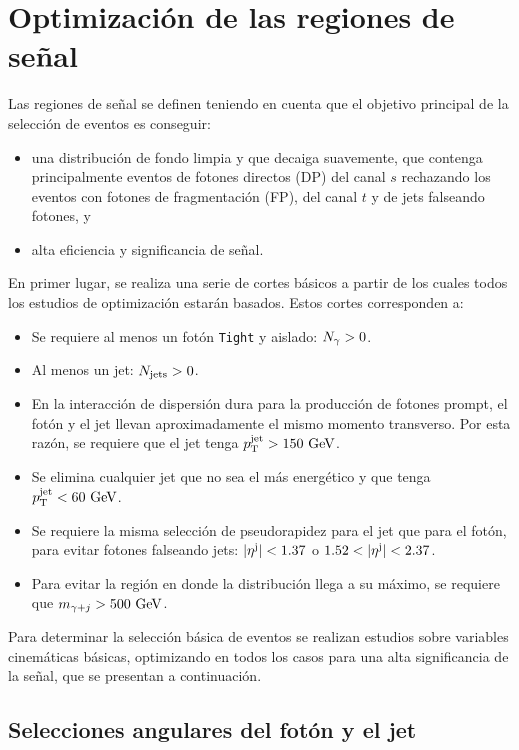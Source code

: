 \section{Optimización de las regiones de señal}
\label{sec:evt_selection:sr_opt}

Las regiones de señal se definen teniendo en cuenta que el objetivo principal de la selección de eventos es conseguir:
\begin{itemize}
    \item una distribución de fondo limpia y que decaiga suavemente, que contenga principalmente eventos \gammajet de fotones directos (\acs{DP}) del canal \(s\) rechazando los eventos con fotones de fragmentación (\acs{FP}), del canal \(t\) y de jets falseando fotones, y
    \item alta eficiencia y significancia de señal.
\end{itemize}


En primer lugar, se realiza una serie de cortes básicos a partir de los cuales todos los estudios de optimización estarán basados. Estos cortes corresponden a:
\begin{itemize}
    \item Se requiere al menos un fotón \texttt{Tight} y aislado: \(N_{\gamma} > 0\).
    \item Al menos un jet: \(N_{\text{jets}} > 0\).
    \item En la interacción de dispersión dura para la producción de fotones prompt, el fotón y el jet llevan aproximadamente el mismo momento transverso. Por esta razón, se requiere que el jet tenga \(p_{\text{T}}^\text{jet} > 150~\text{GeV}\).
    \item Se elimina cualquier jet que no sea el más energético y que tenga \(p_{\text{T}}^\text{jet} < 60~\text{GeV}\).
    \item Se requiere la misma selección de pseudorapidez para el jet que para el fotón, para evitar fotones falseando jets: \(|\eta^{\text{j}}| < 1.37\) o \(1.52 < |\eta^{\text{j}}| < 2.37\).
    \item Para evitar la región en donde la distribución \myj llega a su máximo, se requiere que \(m_{\gamma+j} > 500~\text{GeV}\).
\end{itemize}
Para determinar la selección básica de eventos se realizan estudios sobre variables cinemáticas básicas, optimizando en todos los casos para una alta significancia de la señal, que se presentan a continuación.


\subsection{Selecciones angulares del fotón y el jet}
\label{subsec:evt_selection:sr_opt:eta}



